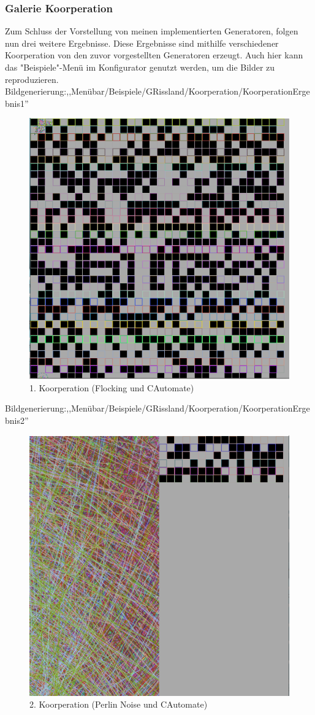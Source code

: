 \documentclass[../mciAusarbeitung.tex]{subfiles}
\begin{document}
            \subsubsection{Galerie Koorperation}
Zum Schluss der Vorstellung von meinen implementierten Generatoren, folgen nun drei weitere Ergebnisse.
Diese Ergebnisse sind mithilfe verschiedener Koorperation von den zuvor vorgestellten Generatoren erzeugt. Auch hier kann das "Beispiele"-Menü im Konfigurator genutzt werden, um die Bilder zu reproduzieren.
 Bildgenerierung:,,Menübar/Beispiele/GRissland/Koorperation/KoorperationErgebnis1''\\
\begin{figure}[H]
\centering
\includegraphics[width=0.5\linewidth]{"kooperation_flocking_cautomate_Mode-uebereinander_50iterations.png"}
\caption[Koorperation-Beispiel1]{1. Koorperation (Flocking und CAutomate)}
\end{figure} 
 Bildgenerierung:,,Menübar/Beispiele/GRissland/Koorperation/KoorperationErgebnis2''\\
  \begin{figure}[H]
\centering
\includegraphics[width=0.5\linewidth]{"kooperation_perlinnoise_cautomate_Mode-2_1_iteration5.png"}
\caption[Koorperation-Beispiel2]{2. Koorperation (Perlin Noise und CAutomate)}
\end{figure}
\end{document}
